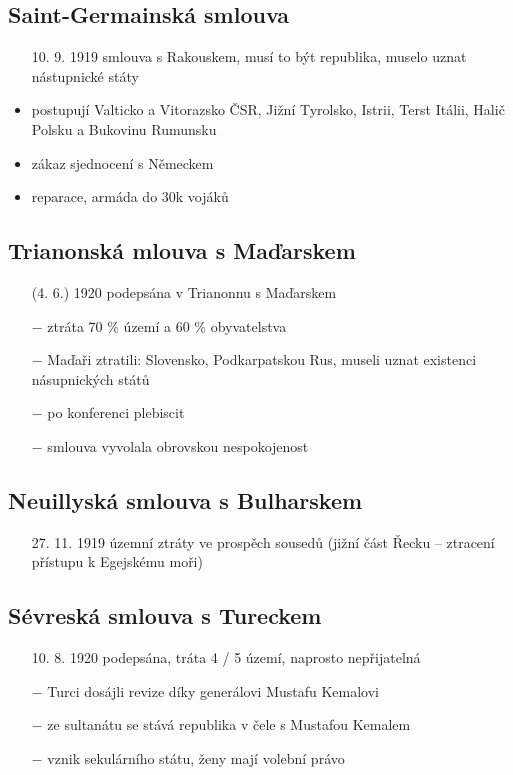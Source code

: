 \documentclass{article}
\begin{document}
\subsection*{Saint-Germainská smlouva }
\begin{itemize}
  \item[10. 9. 1919] smlouva s Rakouskem, musí to být republika, muselo uznat nástupnické státy
  \item postupují Valticko a Vitorazsko ČSR, Jižní Tyrolsko, Istrii, Terst Itálii, Halič Polsku a Bukovinu Rumunsku
  \item zákaz sjednocení s Německem
  \item reparace, armáda do 30k vojáků
\end{itemize}

\subsection*{Trianonská mlouva s Maďarskem}
\begin{itemize}
    \vspace{-0.5em}
    \setlength\itemsep{0.15em}
    \item[(4. 6.) 1920] podepsána v Trianonnu s Maďarskem
    \item[$-$] ztráta 70 \% území a 60 \% obyvatelstva
    \item[$-$] Maďaři ztratili: Slovensko, Podkarpatskou Rus, museli uznat existenci násupnických států
    \item[$-$] po konferenci plebiscit
    \item[$-$] smlouva vyvolala obrovskou nespokojenost
\end{itemize}

\subsection*{Neuillyská smlouva s Bulharskem}
\begin{itemize}
    \vspace{-0.5em}
    \setlength\itemsep{0.15em}
    \item[27. 11. 1919] územní ztráty ve prospěch sousedů (jižní část Řecku -- ztracení přístupu k Egejskému moři)
\end{itemize}

\subsection*{Sévreská smlouva s Tureckem}
\begin{itemize}
    \vspace{-0.5em}
    \setlength\itemsep{0.15em}
    \item[10. 8. 1920] podepsána, tráta 4 / 5 území, naprosto nepřijatelná
    \item[$-$] Turci dosájli revize díky generálovi Mustafu Kemalovi
    \item[$-$] ze sultanátu se stává republika v čele s Mustafou Kemalem
    \item[$-$] vznik sekulárního státu, ženy mají volební právo
\end{itemize}
\end{document}

